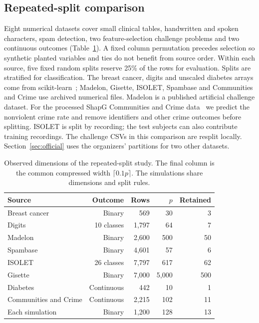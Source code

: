\subsection{Repeated-split comparison}
Eight numerical datasets cover small clinical tables, handwritten and spoken characters, spam detection, two feature-selection challenge problems and two continuous outcomes (Table~\ref{tab:data}). A fixed column permutation precedes selection so synthetic planted variables and ties do not benefit from source order. Within each source, five fixed random splits reserve 25\% of the rows for evaluation. Splits are stratified for classification. The breast cancer, digits and unscaled diabetes arrays come from scikit-learn~\citep{pedregosa2011sklearn}; Madelon, Gisette, ISOLET, Spambase and Communities and Crime use archived numerical files. Madelon is a published artificial challenge dataset. For the processed ShapG Communities and Crime data~\citep{zhao2025shapg} we predict the nonviolent crime rate and remove identifiers and other crime outcomes before splitting. ISOLET is split by recording; the test subjects can also contribute training recordings. The challenge CSVs in this comparison are resplit locally. Section~\ref{sec:official} uses the organizers' partitions for two other datasets.

\begin{table}[tb]
\centering
\caption{Observed dimensions of the repeated-split study. The final column is the common compressed width $\lceil0.1p\rceil$. The simulations share dimensions and split rules.}
\label{tab:data}
\begin{tabular}{lrrrr}
\toprule
Source & Outcome & Rows & $p$ & Retained \\
\midrule
Breast cancer & Binary & 569 & 30 & 3\\
Digits & 10 classes & 1,797 & 64 & 7\\
Madelon & Binary & 2,600 & 500 & 50\\
Spambase & Binary & 4,601 & 57 & 6\\
ISOLET & 26 classes & 7,797 & 617 & 62\\
Gisette & Binary & 7,000 & 5,000 & 500\\
Diabetes & Continuous & 442 & 10 & 1\\
Communities and Crime & Continuous & 2,215 & 102 & 11\\
Each simulation & Binary & 1,200 & 128 & 13\\
\bottomrule
\end{tabular}
\end{table}

